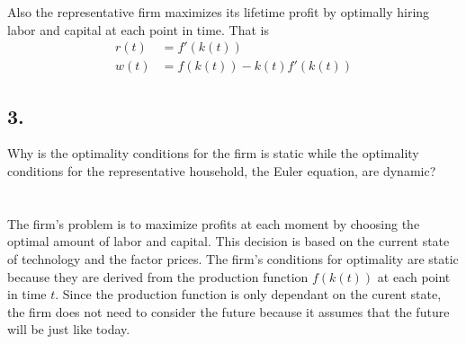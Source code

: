 \documentclass[12pt]{extarticle}
\def\secondarycolor{Golden}
\newcommand{\problem}[1]{
    \subsection*{\textcolor{\secondarycolor}{#1}}
    \addcontentsline{toc}{subsection}{\protect\numberline{}#1}
}
\begin{document}
\newpage
Also the representative firm maximizes its lifetime profit
by optimally hiring labor and capital at each point
in time. That is
\begin{align*}
    r(t) &=f '(k(t))\\
    w(t) &=f (k(t)) - k(t)f '(k(t))
\end{align*}

\problem{3.}Why is the optimality conditions for the firm
is static while the optimality conditions for the representative household,
the Euler equation, are dynamic?\\\\\\

The firm's problem is to maximize profits at each moment
by choosing the optimal amount of labor and capital.
This decision is based on the current state of technology and the factor prices.
The firm's conditions for optimality are static
because they are derived from the production function $f(k(t))$ at each point in time $t$.
Since the production function is only dependant on the curent state,
the firm does not need to consider the future
because it assumes that the future will be just like today.\\
\end{document}
